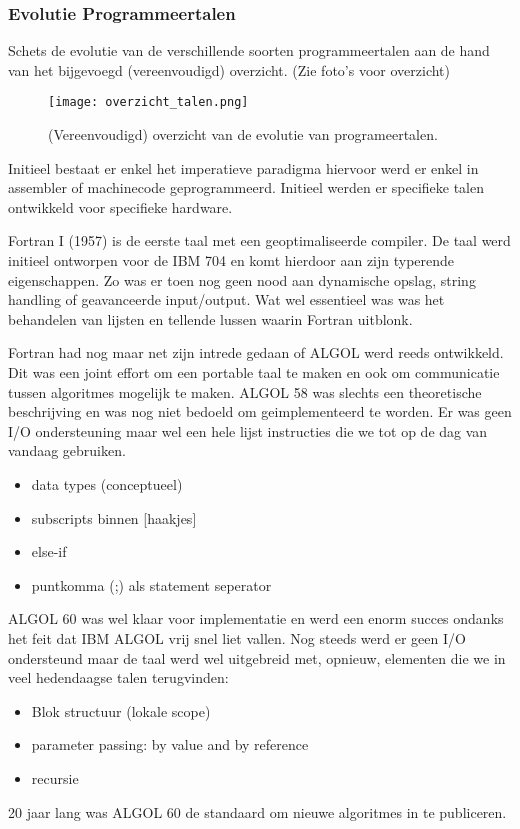 \documentclass[../main.tex]{subfiles}
\begin{document}
\subsubsection{Evolutie Programmeertalen}
\begin{question}
Schets de evolutie van de verschillende soorten programmeertalen aan de hand van het bijgevoegd (vereenvoudigd) overzicht. (Zie foto's voor overzicht)
\begin{figure}
		\centering
		\texttt{[image: overzicht\_talen.png]}
		\caption{(Vereenvoudigd) overzicht van de evolutie van programeertalen.}
\end{figure}
\end{question}
\begin{solution}
Initieel bestaat er enkel het imperatieve paradigma hiervoor werd er enkel in assembler of machinecode geprogrammeerd.
Initieel werden er specifieke talen ontwikkeld voor specifieke hardware.

Fortran I (1957) is de eerste taal met een geoptimaliseerde compiler. 
De taal werd initieel ontworpen voor de IBM 704 en komt hierdoor aan zijn typerende eigenschappen.
Zo was er toen nog geen nood aan dynamische opslag, string handling of geavanceerde input/output.
Wat wel essentieel was was het behandelen van lijsten en tellende lussen waarin Fortran uitblonk.

Fortran had nog maar net zijn intrede gedaan of ALGOL werd reeds ontwikkeld.
Dit was een joint effort om een portable taal te maken en ook om communicatie tussen algoritmes mogelijk te maken. 
ALGOL 58 was slechts een theoretische beschrijving en was nog niet bedoeld om geimplementeerd te worden.
Er was geen I/O ondersteuning maar wel een hele lijst instructies die we tot op de dag van vandaag gebruiken.
\begin{itemize}
		\item data types (conceptueel)
		\item subscripts binnen [haakjes]
		\item else-if
		\item puntkomma (;) als statement seperator  
\end{itemize}
ALGOL 60 was wel klaar voor implementatie en werd een enorm succes ondanks het feit dat IBM ALGOL vrij snel liet vallen.
Nog steeds werd er geen I/O ondersteund maar de taal werd wel uitgebreid met, opnieuw, elementen die we in veel hedendaagse talen terugvinden:
\begin{itemize}
		\item Blok structuur (lokale scope) 
		\item parameter passing: by value and by reference 
		\item recursie 
\end{itemize}
20 jaar lang was ALGOL 60 de standaard om nieuwe algoritmes in te publiceren.


\end{solution}
\end{document}
